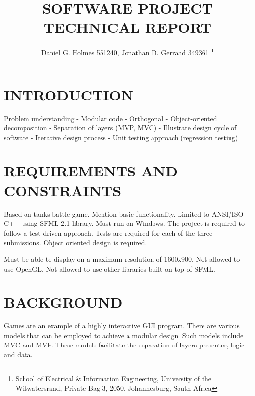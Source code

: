 \documentclass[10pt,twocolumn]{witseiepaper}
\begin{document}
\title{SOFTWARE PROJECT TECHNICAL REPORT}

\author{Daniel G. Holmes 551240, Jonathan D. Gerrand 349361
\thanks{School of Electrical \& Information Engineering, University of the
Witwatersrand, Private Bag 3, 2050, Johannesburg, South Africa}
}

%



\maketitle
\thispagestyle{empty}\pagestyle{empty}


%
\section{INTRODUCTION}
Problem understanding
- Modular code
- Orthogonal
- Object-oriented decomposition
- Separation of layers (MVP, MVC)
- Illustrate design cycle of software
- Iterative design process
- Unit testing approach (regression testing)


%
\section{REQUIREMENTS AND CONSTRAINTS}

Based on tanks battle game. Mention basic functionality. Limited to ANSI/ISO C++ using SFML 2.1 library. Must run on Windows. The project is required to follow a test driven approach. Tests are required for each of the three submissions. Object oriented design is required.

Must be able to display on a maximum resolution of 1600x900. Not allowed to use OpenGL. Not allowed to use other libraries built on top of SFML. 


%
\section{BACKGROUND}
Games are an example of a highly interactive GUI program. There are various models that can be employed to achieve a modular design. Such models include MVC and MVP. These models facilitate the separation of layers presenter, logic and data. 
\end{document}
